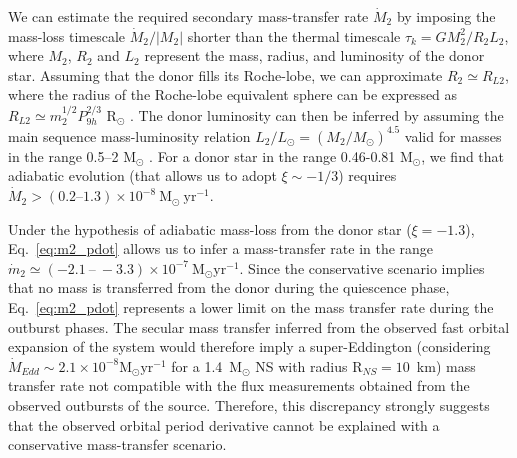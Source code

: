 \documentclass[fleqn,usenatbib]{mnras}
\begin{document}
We can estimate the required secondary mass-transfer rate $\dot{M}_2$ by imposing the mass-loss timescale $\dot{M}_2/|M_2|$ shorter than the thermal timescale $\tau_k=GM_2^2/R_2L_2$, where $M_2$, $R_2$ and $L_2$ represent the mass, radius, and luminosity of the donor star. Assuming that the donor fills its Roche-lobe, we can approximate $R_2\simeq R_{L2}$, where the radius of the Roche-lobe equivalent sphere can be expressed as $R_{L2}\simeq m_2^{1/2} P_{9h}^{2/3}$ R$_\odot$ \citep[obtained by combining Paczy\'nsky's Roche-lobe analytic approximation with Kepler's third law, ][]{Paczynski71}. The donor luminosity can then be inferred by assuming the main sequence mass-luminosity relation $L_2/L_{\odot}=(M_2/M_{\odot})^{4.5}$ valid for masses in the range 0.5--2 M$_\odot$ \citep{Chabrier:2009vh}. For a donor star in the range 0.46-0.81 M$_\odot$, we find that adiabatic evolution (that allows us to adopt $\xi\sim-1/3$) requires $\dot{M}_2>(0.2\text{--}1.3)\times 10^{-8}~\text{M}_{\odot}~\text{yr}^{-1}$.

Under the hypothesis of adiabatic mass-loss from the donor star ($\xi=-1.3$), Eq.~\ref{eq:m2_pdot} allows us to infer a mass-transfer rate in the range $\dot{m}_{2}\simeq(-2.1 ~\text{--}~ -3.3)\times 10^{-7}~\text{M}_{\odot} \text{yr}^{-1}$. Since the conservative scenario implies that no mass is transferred from the donor during the quiescence phase, Eq.~\ref{eq:m2_pdot} represents a lower limit on the mass transfer rate during the outburst phases. The secular mass transfer inferred from the observed fast orbital expansion of the system would therefore imply a super-Eddington (considering $\dot{M}_{Edd}\sim2.1\times 10^{-8} \text{M}_{\odot} \text{yr}^{-1}$ for a 1.4~$\text{M}_{\odot}$ NS with radius $\text{R}_{NS}=10$~km) mass transfer rate not compatible with the flux measurements obtained from the observed outbursts of the source. Therefore, this discrepancy strongly suggests that the observed orbital period derivative cannot be explained with a conservative mass-transfer scenario.
\end{document}
